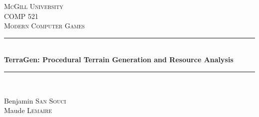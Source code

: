 \begin{titlepage}

\newcommand{\HRule}{\rule{\linewidth}{0.5mm}} %

\center %
 

\textsc{\LARGE McGill University}\\[1.5cm] %
\textsc{\Large COMP 521}\\[0.5cm] %
\textsc{\large Modern Computer Games}\\[0.5cm] %


\HRule \\[0.4cm]
{ \huge \bfseries TerraGen: Procedural Terrain Generation and Resource Analysis}\\[0.4cm] %
\HRule \\[1.0cm]
 

\begin{minipage}{0.4\textwidth}
\begin{flushleft} \large
Benjamin \textsc{San Souci} \\ %
Maude \textsc{Lemaire} %
\end{flushleft}
\end{minipage}
~
\begin{minipage}{0.4\textwidth}
\end{minipage}\\[4cm]



\end{titlepage}
